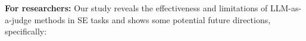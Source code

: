 

\textbf{For researchers:} Our study reveals the effectiveness and limitations of LLM-as-a-judge methods in SE tasks and shows some potential future directions, specifically:

